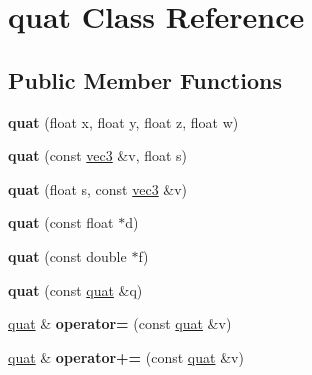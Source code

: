 \hypertarget{classquat}{\section{quat Class Reference}
\label{classquat}
}
\subsection*{Public Member Functions}
\begin{DoxyCompactItemize}
\item 
\hypertarget{classquat_a5284f92399e537ee18cd71980ca1a7c3}{{\bfseries quat} (float x, float y, float z, float w)}\label{classquat_a5284f92399e537ee18cd71980ca1a7c3}

\item 
\hypertarget{classquat_ab21fb1fd605aed4867858a197722f9e6}{{\bfseries quat} (const \hyperlink{classvec3}{vec3} \&v, float s)}\label{classquat_ab21fb1fd605aed4867858a197722f9e6}

\item 
\hypertarget{classquat_ad6c0eb5b08a1c62013001088ec2230d5}{{\bfseries quat} (float s, const \hyperlink{classvec3}{vec3} \&v)}\label{classquat_ad6c0eb5b08a1c62013001088ec2230d5}

\item 
\hypertarget{classquat_ab455374c3c347698ede47134b976c2ba}{{\bfseries quat} (const float $\ast$d)}\label{classquat_ab455374c3c347698ede47134b976c2ba}

\item 
\hypertarget{classquat_a3d299e88dc443d98b586a8270087352e}{{\bfseries quat} (const double $\ast$f)}\label{classquat_a3d299e88dc443d98b586a8270087352e}

\item 
\hypertarget{classquat_a1725a31a3c580bc4e9e2b5af02cbfbaf}{{\bfseries quat} (const \hyperlink{classquat}{quat} \&q)}\label{classquat_a1725a31a3c580bc4e9e2b5af02cbfbaf}

\item 
\hypertarget{classquat_a21d40d57d0dd92d71ac7b3fd797dbb71}{\hyperlink{classquat}{quat} \& {\bfseries operator=} (const \hyperlink{classquat}{quat} \&v)}\label{classquat_a21d40d57d0dd92d71ac7b3fd797dbb71}

\item 
\hypertarget{classquat_af0ed15de2212d7dd54f06aa18a012424}{\hyperlink{classquat}{quat} \& {\bfseries operator+=} (const \hyperlink{classquat}{quat} \&v)}\label{classquat_af0ed15de2212d7dd54f06aa18a012424}


\end{DoxyCompactItemize}
